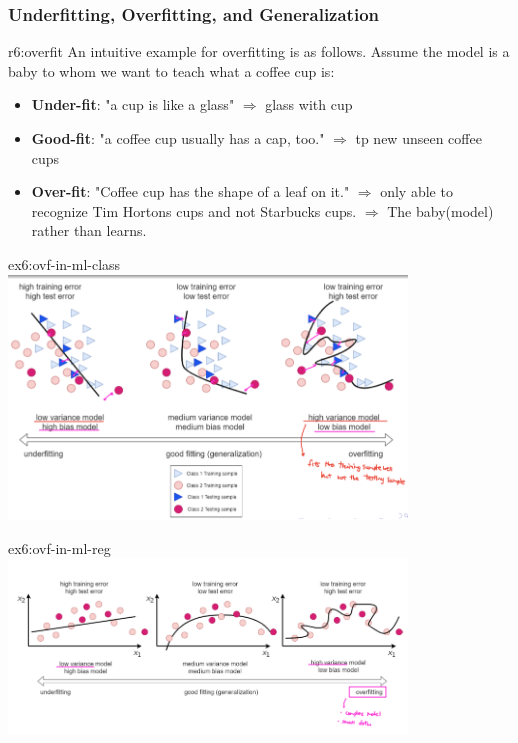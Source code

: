 \documentclass{tron}
\begin{document}
\subsubsection{Underfitting, Overfitting, and Generalization}
\begin{remark}[Overfitting]{r6:overfit}
	An intuitive example for overfitting is as follows. Assume the model is a baby to whom we want to teach what a coffee cup is:
	
	\begin{itemize}
		\item \textbf{Under-fit}: "a cup is like a glass" $\Rightarrow$  glass with cup
		\item \textbf{Good-fit}: "a coffee cup usually has a cap, too." $\Rightarrow$  tp new unseen coffee cups
		\item \textbf{Over-fit}: "Coffee cup has the shape of a leaf on it." $\Rightarrow$ only able to recognize Tim Hortons cups and not Starbucks cups. $\Rightarrow$ The baby(model)  rather than learns.
	\end{itemize}
	
	\begin{example}{ex6:ovf-in-ml-class}
		\includegraphics[width=400px]{Figs/Lec6/ovf-class}
	\end{example}

	\begin{example}{ex6:ovf-in-ml-reg}
		\includegraphics[width=400px]{Figs/Lec6/ovf-reg}
	\end{example}	
\end{remark}
\end{document}
